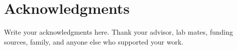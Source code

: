 
\chapter*{Acknowledgments}

Write your acknowledgments here. Thank your advisor, lab mates, funding
sources, family, and anyone else who supported your work.
